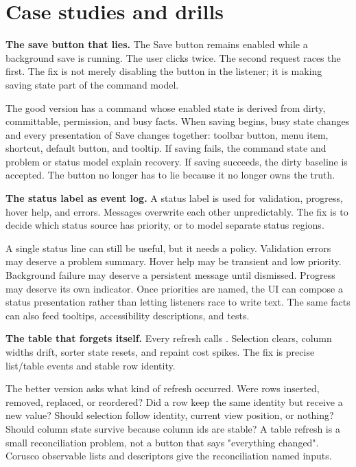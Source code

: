 \section{Case studies and drills}

\textbf{The save button that lies.}
The Save button remains enabled while a background save is running. The user clicks twice. The second request races the first. The fix is not merely disabling the button in the listener; it is making saving state part of the command model.

The good version has a command whose enabled state is derived from dirty,
committable, permission, and busy facts. When saving begins, busy state changes
and every presentation of Save changes together: toolbar button, menu item,
shortcut, default button, and tooltip. If saving fails, the command state and
problem or status model explain recovery. If saving succeeds, the dirty
baseline is accepted. The button no longer has to lie because it no longer owns
the truth.

\textbf{The status label as event log.}
A status label is used for validation, progress, hover help, and errors. Messages overwrite each other unpredictably. The fix is to decide which status source has priority, or to model separate status regions.

A single status line can still be useful, but it needs a policy. Validation
errors may deserve a problem summary. Hover help may be transient and low
priority. Background failure may deserve a persistent message until dismissed.
Progress may deserve its own indicator. Once priorities are named, the UI can
compose a status presentation rather than letting listeners race to write text.
The same facts can also feed tooltips, accessibility descriptions, and tests.

\textbf{The table that forgets itself.}
Every refresh calls . Selection clears, column widths drift, sorter state resets, and repaint cost spikes. The fix is precise list/table events and stable row identity.

The better version asks what kind of refresh occurred. Were rows inserted,
removed, replaced, or reordered? Did a row keep the same identity but receive a
new value? Should selection follow identity, current view position, or nothing?
Should column state survive because column ids are stable? A table refresh is a
small reconciliation problem, not a button that says "everything changed".
Corusco observable lists and descriptors give the reconciliation named inputs.

